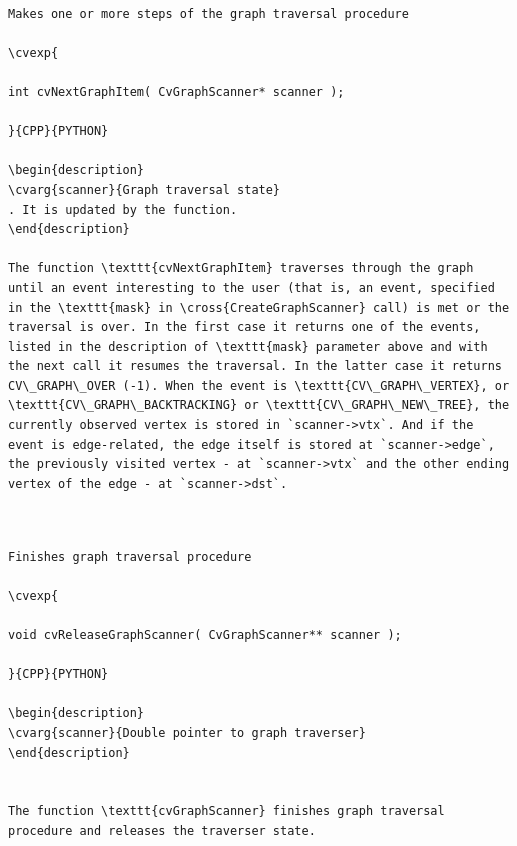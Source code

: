 \label{NextGraphItem}
\begin{verbatim}

Makes one or more steps of the graph traversal procedure

\cvexp{

int cvNextGraphItem( CvGraphScanner* scanner );

}{CPP}{PYTHON}

\begin{description}
\cvarg{scanner}{Graph traversal state}
. It is updated by the function.
\end{description}

The function \texttt{cvNextGraphItem} traverses through the graph until an event interesting to the user (that is, an event, specified in the \texttt{mask} in \cross{CreateGraphScanner} call) is met or the traversal is over. In the first case it returns one of the events, listed in the description of \texttt{mask} parameter above and with the next call it resumes the traversal. In the latter case it returns CV\_GRAPH\_OVER (-1). When the event is \texttt{CV\_GRAPH\_VERTEX}, or \texttt{CV\_GRAPH\_BACKTRACKING} or \texttt{CV\_GRAPH\_NEW\_TREE}, the currently observed vertex is stored in `scanner->vtx`. And if the event is edge-related, the edge itself is stored at `scanner->edge`, the previously visited vertex - at `scanner->vtx` and the other ending vertex of the edge - at `scanner->dst`.


\end{verbatim}
\label{ReleaseGraphScanner}
\begin{verbatim}

Finishes graph traversal procedure

\cvexp{

void cvReleaseGraphScanner( CvGraphScanner** scanner );

}{CPP}{PYTHON}

\begin{description}
\cvarg{scanner}{Double pointer to graph traverser}
\end{description}


The function \texttt{cvGraphScanner} finishes graph traversal procedure and releases the traverser state.


\end{verbatim}
